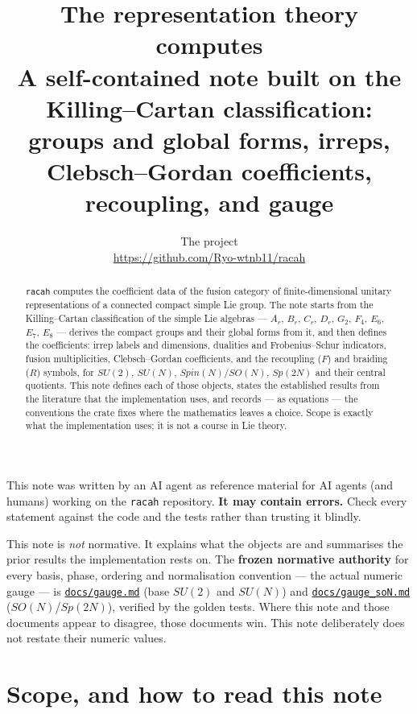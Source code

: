\documentclass[11pt,a4paper]{article}
\title{\textbf{The representation theory \code{racah} computes}\\[0.3em]
\large A self-contained note built on the Killing--Cartan classification:\\
groups and global forms, irreps, Clebsch--Gordan coefficients,\\
recoupling, and gauge}
\author{The \code{racah} project \\ \small\url{https://github.com/Ryo-wtnb11/racah}}
\date{}
\theoremstyle{plain}
\theoremstyle{definition}
\newcommand{\code}[1]{\texttt{#1}}
\newcommand{\gaugemd}{\href{https://github.com/Ryo-wtnb11/racah/blob/main/docs/gauge.md}{\code{docs/gauge.md}}}
\newcommand{\gaugeson}{\href{https://github.com/Ryo-wtnb11/racah/blob/main/docs/gauge_soN.md}{\code{docs/gauge\_soN.md}}}
\begin{document}
\maketitle
\thispagestyle{plain}

\begin{tcolorbox}[colback=yellow!8!white,colframe=orange!70!black,
  title=\textbf{Notice: AI-generated document}]
This note was written by an AI agent as reference material for AI agents (and
humans) working on the \code{racah} repository. \textbf{It may contain errors.}
Check every statement against the code and the tests rather than trusting it
blindly.

\medskip
This note is \emph{not} normative. It explains what the objects are and
summarises the prior results the implementation rests on. The \textbf{frozen
normative authority} for every basis, phase, ordering and normalisation
convention --- the actual numeric gauge --- is \gaugemd{} (base $SU(2)$ and
$SU(N)$) and \gaugeson{} ($SO(N)$/$Sp(2N)$), verified by the golden tests.
Where this note and those documents appear to disagree, those documents win.
This note deliberately does not restate their numeric values.
\end{tcolorbox}

\begin{abstract}
\noindent
\code{racah} computes the coefficient data of the fusion category of
finite-dimensional unitary representations of a connected compact simple Lie
group. The note starts from the Killing--Cartan classification of the simple
Lie algebras --- $A_r$, $B_r$, $C_r$, $D_r$, $G_2$, $F_4$, $E_6$, $E_7$, $E_8$
--- derives the compact groups and their global forms from it, and then defines
the coefficients: irrep labels and dimensions, dualities and Frobenius--Schur
indicators,
fusion multiplicities, Clebsch--Gordan coefficients, and the recoupling
($F$) and braiding ($R$) symbols, for $SU(2)$, $SU(N)$, $Spin(N)/SO(N)$,
$Sp(2N)$ and their central quotients. This note defines each of those objects,
states the established results from the literature that the implementation
uses, and records --- as equations --- the conventions the crate fixes where the
mathematics leaves a choice. Scope is exactly what the implementation uses; it
is not a course in Lie theory.
\end{abstract}

\tableofcontents
\bigskip

\section{Scope, and how to read this note}
\end{document}
